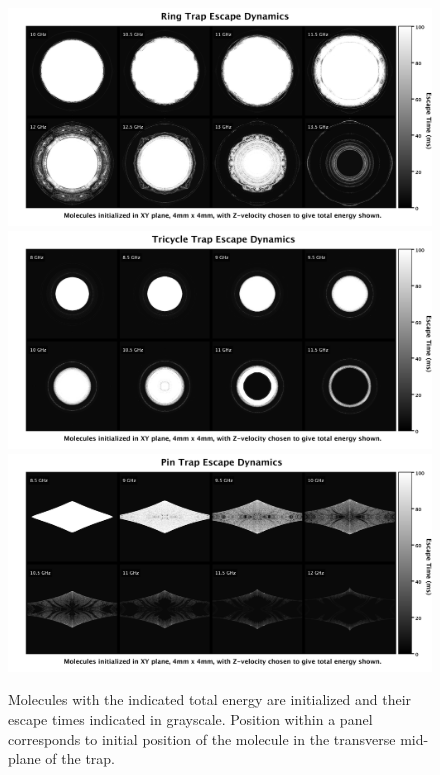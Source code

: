 \documentclass[defaultstyle,11pt]{thesis}
\begin{document}
\begin{figure}[ht!]
\centering
\includegraphics[width=13cm]{ringescape.png}\\
\includegraphics[width=13cm]{tricycleescape.png}\\
\includegraphics[width=13cm]{pinescape.png}
\caption[Escape Dynamics in the Ring, Tricycle and Pin traps.]{Molecules with the indicated total energy are initialized and their escape times indicated in grayscale. Position within a panel corresponds to initial position of the molecule in the transverse mid-plane of the trap.
\label{escapes}}
\end{figure}
\end{document}
